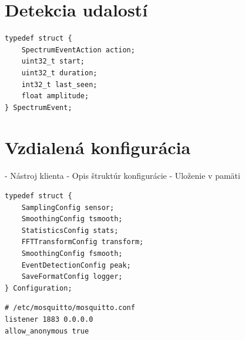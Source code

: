 \section{Detekcia udalostí}
\begin{lstlisting}[style=cstyle]
typedef struct {
    SpectrumEventAction action;
    uint32_t start;
    uint32_t duration;
    int32_t last_seen;
    float amplitude;
} SpectrumEvent;
\end{lstlisting}

\section{Vzdialená konfigurácia}
- Nástroj klienta
- Opis štruktúr konfigurácie
- Uloženie v pamäti
\begin{lstlisting}[style=cstyle]
typedef struct {
    SamplingConfig sensor;
    SmoothingConfig tsmooth;
    StatisticsConfig stats;
    FFTTransformConfig transform;
    SmoothingConfig fsmooth;
    EventDetectionConfig peak;
    SaveFormatConfig logger;
} Configuration;
\end{lstlisting}

\begin{verbatim}
# /etc/mosquitto/mosquitto.conf
listener 1883 0.0.0.0
allow_anonymous true
\end{verbatim}

\emptypage
